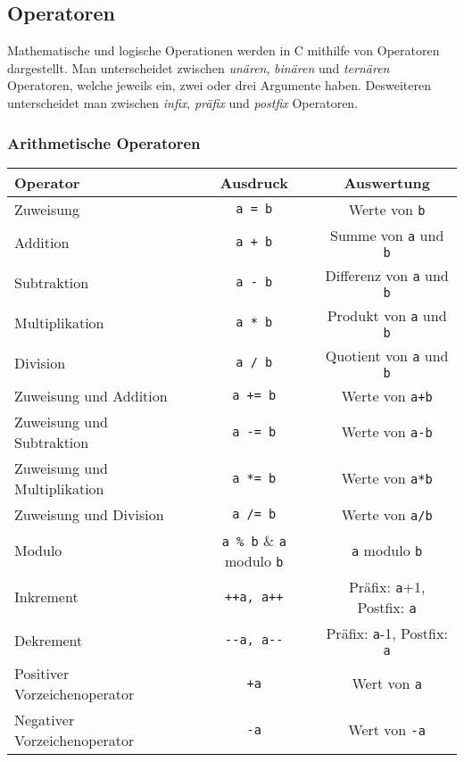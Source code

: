 \subsection{Operatoren}
\iflecturer
\begin{framed}
\end{framed}
\fi

Mathematische und logische Operationen werden in C mithilfe von Operatoren dargestellt.
Man unterscheidet zwischen \emph{unären}, \emph{binären} und \emph{ternären} Operatoren, welche jeweils ein, zwei oder drei Argumente haben.
Desweiteren unterscheidet man zwischen \emph{infix}, \emph{präfix} und \emph{postfix} Operatoren.

\iflecturer
\begin{framed}
  \blackboard{}
\end{framed}
\fi

\subsubsection{Arithmetische Operatoren}

\begin{table}[H]
  \centering
  \begin{tabular}{l c c}
    \hline
    Operator & Ausdruck & Auswertung \\
    \hline
    Zuweisung & \verb|a = b| & Werte von \verb|b| \\
    Addition & \verb|a + b| & Summe von \verb|a| und \verb|b| \\
    Subtraktion & \verb|a - b| & Differenz von \verb|a| und \verb|b| \\
    Multiplikation & \verb|a * b| & Produkt von \verb|a| und \verb|b| \\
    Division & \verb|a / b| & Quotient von \verb|a| und \verb|b| \\
    Zuweisung und Addition & \verb|a += b| & Werte von \verb|a+b| \\
    Zuweisung und Subtraktion & \verb|a -= b| & Werte von \verb|a-b| \\
    Zuweisung und Multiplikation & \verb|a *= b| & Werte von \verb|a*b| \\
    Zuweisung und Division & \verb|a /= b| & Werte von \verb|a/b| \\
    Modulo & \verb|a % b| & \verb|a| modulo \verb|b| \\
    Inkrement & \verb|++a, a++| & Präfix: \verb|a|+1, Postfix: \verb|a| \\
    Dekrement & \verb|--a, a--| & Präfix: \verb|a|-1, Postfix: \verb|a| \\
    Positiver Vorzeichenoperator & \verb|+a| & Wert von \verb|a| \\
    Negativer Vorzeichenoperator & \verb|-a| & Wert von \verb|-a|  \\
    \hline
  \end{tabular}
\end{table}


